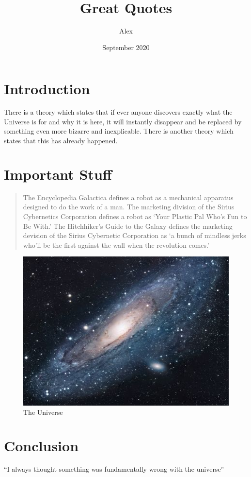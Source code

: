 \documentclass{article}
\title{Great Quotes}
\author{Alex}
\date{September 2020}
\begin{document}
\maketitle

\section{Introduction}
There is a theory which states that if ever anyone discovers exactly what the Universe is for and why it is here, it will instantly disappear and be replaced by something even more bizarre and inexplicable.
There is another theory which states that this has already happened.

\section{Important Stuff}

\begin{quote}
The Encyclopedia Galactica defines a robot as a mechanical apparatus designed to do the work of a man. The marketing division of the Sirius Cybernetics Corporation defines a robot as `Your Plastic Pal Who's Fun to Be With.' The Hitchhiker's Guide to the Galaxy defines the marketing devision of the Sirius Cybernetic Corporation as `a bunch of mindless jerks who'll be the first against the wall when the revolution comes.'
\end{quote}

\begin{figure}[h!]
\centering
\includegraphics[scale=1.7]{universe}
\caption{The Universe}
\label{fig:universe}
\end{figure}

\section{Conclusion}
``I always thought something was fundamentally wrong with the universe'' \citep{adams1995hitchhiker}



\end{document}
